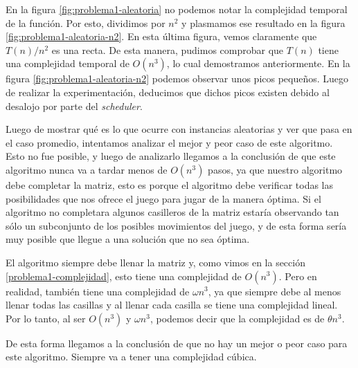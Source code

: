 En la figura \ref{fig:problema1-aleatoria} no podemos notar la complejidad temporal de la función. Por esto, dividimos por $n^2$ y plasmamos ese resultado en la figura \ref{fig:problema1-aleatoria-n2}. En esta última figura, vemos claramente que $T(n) / n ^ 2$ es una recta. De esta manera, pudimos comprobar que $T(n)$ tiene una complejidad temporal de $O(n^3)$, lo cual demostramos anteriormente. En la figura \ref{fig:problema1-aleatoria-n2} podemos observar unos picos pequeños. Luego de realizar la experimentación, deducimos que dichos picos existen debido al desalojo por parte del \emph{scheduler}.

Luego de mostrar qué es lo que ocurre con instancias aleatorias y ver que pasa en el caso promedio, intentamos analizar el mejor y peor caso de este algoritmo. Esto no fue posible, y luego de analizarlo llegamos a la conclusión de que este algoritmo nunca va a tardar menos de $O(n^3)$ pasos, ya que nuestro algoritmo debe completar la matriz, esto es porque el algoritmo debe verificar todas las posibilidades que nos ofrece el juego para jugar de la manera óptima. Si el algoritmo no completara algunos casilleros de la matriz estaría observando tan sólo un subconjunto de los posibles movimientos del juego, y de esta forma sería muy posible que llegue a una solución que no sea óptima.

El algoritmo siempre debe llenar la matriz y, como vimos en la sección \ref{problema1-complejidad}, esto tiene una complejidad de $O(n^3)$. Pero en realidad, también tiene una complejidad de $\omega{n^3}$, ya que siempre debe al menos llenar todas las casillas y al llenar cada casilla se tiene una complejidad lineal. Por lo tanto, al ser $O(n^3)$ y $\omega{n^3}$, podemos decir que la complejidad es de $\theta{n^3}$.

De esta forma llegamos a la conclusión de que no hay un mejor o peor caso para este algoritmo. Siempre va a tener una complejidad cúbica.